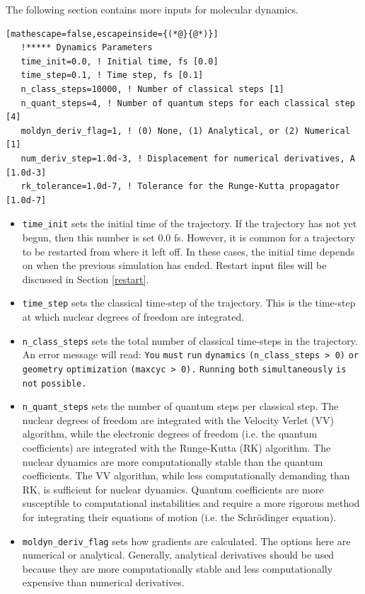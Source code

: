 \documentclass[letterpaper,12pt,titlepage]{article}
\begin{document}
The following section contains more inputs for molecular dynamics.
\begin{lstlisting}[mathescape=false,escapeinside={(*@}{@*)}]
   !***** Dynamics Parameters
   time_init=0.0, ! Initial time, fs [0.0]
   time_step=0.1, ! Time step, fs [0.1]
   n_class_steps=10000, ! Number of classical steps [1]
   n_quant_steps=4, ! Number of quantum steps for each classical step [4]
   moldyn_deriv_flag=1, ! (0) None, (1) Analytical, or (2) Numerical [1]
   num_deriv_step=1.0d-3, ! Displacement for numerical derivatives, A [1.0d-3]
   rk_tolerance=1.0d-7, ! Tolerance for the Runge-Kutta propagator [1.0d-7]
\end{lstlisting}
\begin{itemize}
\item \verb+time_init+ sets the initial time of the trajectory.  If the trajectory has not yet begun, then this number is set 0.0 fs.  However, it is common for a trajectory to be restarted from where it left off.  In these cases, the initial time depends on when the previous simulation has ended.  Restart input files will be discussed in Section \ref{restart}.
\item \verb+time_step+ sets the classical time-step of the trajectory.  This is the time-step at which nuclear degrees of freedom are integrated.
\item \verb+n_class_steps+ sets the total number of classical time-steps in the trajectory.  An error message will read: \verb+You+ \verb+must+ \verb+run+ \verb+dynamics+ \verb+(n_class_steps > 0)+ \verb+or+ \verb+geometry+ \verb+optimization+ \verb+(maxcyc > 0).+ \verb+Running+ \verb+both+ \verb+simultaneously+ \verb+is+ \verb+not+ \verb+possible.+
\item \verb+n_quant_steps+ sets the number of quantum steps per classical step.  The nuclear degrees of freedom are integrated with the Velocity Verlet (VV) algorithm, while the electronic degrees of freedom (i.e. the quantum coefficients) are integrated with the Runge-Kutta (RK) algorithm.  The nuclear dynamics are more computationally stable than the quantum coefficients.  The VV algorithm, while less computationally demanding than RK, is sufficient for nuclear dynamics.  Quantum coefficients are more susceptible to computational instabilities and require a more rigorous method for integrating their equations of motion (i.e. the Schr\"{o}dinger equation).
\item \verb+moldyn_deriv_flag+ sets how gradients are calculated.  The options here are numerical or analytical.  Generally, analytical derivatives should be used because they are more computationally stable and less computationally expensive than numerical derivatives.

\end{itemize}
\end{document}
